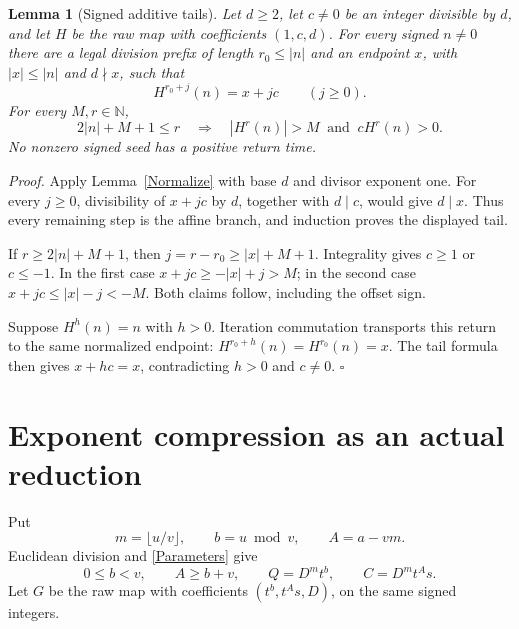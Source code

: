 \documentclass[11pt,letterpaper]{article}
\newcommand{\N}{\mathbb{N}}
\newtheorem{lemma}[theorem]{Lemma}
\newenvironment{proof}{\noindent\textit{Proof.}}{\hfill\(\square\)}
\begin{document}
\begin{lemma}[Signed additive tails]\label{Additive}
Let \(d\ge2\), let \(c\ne0\) be an integer divisible by \(d\), and let
\(H\) be the raw map with coefficients \((1,c,d)\). For every signed
\(n\ne0\) there are a legal division prefix of length \(r_0\le |n|\) and
an endpoint \(x\), with \(|x|\le |n|\) and \(d\nmid x\), such that
\[
H^{r_0+j}(n)=x+jc\qquad(j\ge0).
\]
For every \(M,r\in\N\),
\[
2|n|+M+1\le r
\quad\Longrightarrow\quad
|H^r(n)|>M\ \text{ and }\ cH^r(n)>0.
\]
No nonzero signed seed has a positive return time.
\end{lemma}
\begin{proof}
Apply Lemma~\ref{Normalize} with base \(d\) and divisor exponent one.
For every \(j\ge0\), divisibility of \(x+jc\) by \(d\), together with
\(d\mid c\), would give \(d\mid x\). Thus every remaining step is the
affine branch, and induction proves the displayed tail.

If \(r\ge2|n|+M+1\), then \(j=r-r_0\ge |x|+M+1\). Integrality gives
\(c\ge1\) or \(c\le-1\). In the first case
\(x+jc\ge-|x|+j>M\); in the second case
\(x+jc\le |x|-j<-M\). Both claims follow, including the offset sign.

Suppose \(H^h(n)=n\) with \(h>0\). Iteration commutation transports this
return to the same normalized endpoint:
\(H^{r_0+h}(n)=H^{r_0}(n)=x\).
The tail formula then gives \(x+hc=x\), contradicting \(h>0\) and \(c\ne0\).
\end{proof}

\section{Exponent compression as an actual reduction}

Put
\[
m=\lfloor u/v\rfloor,\qquad b=u\bmod v,\qquad A=a-vm.
\]
Euclidean division and \eqref{Parameters} give
\begin{equation}\label{Factor}
0\le b<v,\qquad A\ge b+v,\qquad
Q=D^m t^b,\qquad C=D^m t^A s.
\end{equation}
Let \(G\) be the raw map with coefficients
\((t^b,t^A s,D)\), on the same signed integers.
\end{document}
